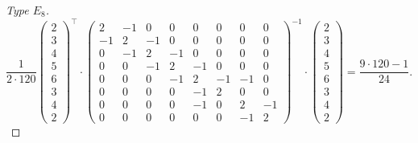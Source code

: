 \documentclass[11pt,a4paper]{amsart}
\theoremstyle{definition}
\begin{document}
\begin{proof}[Type $E_8$]
\[ 
\frac{1}{2\cdot 120}
\begin{pmatrix}
2 \\ 3 \\ 4 \\5  \\ 6 \\ 3 \\ 4 \\ 2
\end{pmatrix}^{\top}
\cdot
\begin{pmatrix}
2 & -1 & 0 & 0 & 0 & 0 & 0 & 0\\
-1 & 2 & -1 & 0 & 0 & 0 & 0 & 0\\
0 & -1 & 2 & -1 & 0 & 0 & 0 & 0 \\
0 & 0 & -1 & 2 & -1 & 0 & 0 & 0 \\
0 & 0 & 0 & -1 & 2 & -1 & -1 & 0 \\
0 & 0 & 0 & 0 & -1 & 2 & 0 & 0 \\
0 & 0 & 0 & 0  & -1 & 0 & 2 & -1 \\
0 & 0 & 0 & 0 & 0  & 0 & -1 & 2
\end{pmatrix}^{-1} 
\cdot
\begin{pmatrix}
2 \\ 3 \\ 4 \\5  \\ 6 \\ 3 \\ 4 \\ 2
\end{pmatrix}
=\frac{9\cdot 120-1}{24}.
\]
\end{proof}
\end{document}
